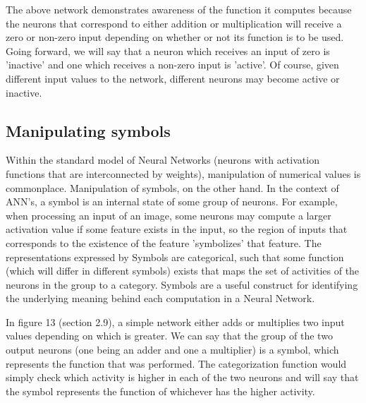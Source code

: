 \documentclass{article}
\begin{document}
		The above network demonstrates awareness of the function it computes because the neurons that correspond to either addition or multiplication will receive a zero or non-zero input depending on whether or not its function is to be used. Going forward, we will say that a neuron which receives an input of zero is 'inactive' and one which receives a non-zero input is 'active'. Of course, given different input values to the network, different neurons may become active or inactive. 
	
	\subsection{Manipulating symbols}
	
		Within the standard model of Neural Networks (neurons with activation functions that are interconnected by weights), manipulation of numerical values is commonplace. Manipulation of symbols, on the other hand. In the context of ANN's, a symbol is an internal state of some group of neurons. For example, when processing an input of an image, some neurons may compute a larger activation value if some feature exists in the input, so the region of inputs that corresponds to the existence of the feature 'symbolizes' that feature. The representations expressed by Symbols are categorical, such that some function (which will differ in different symbols) exists that maps the set of activities of the neurons in the group to a category. Symbols are a useful construct for identifying the underlying meaning behind each computation in a Neural Network.
		
		In figure 13 (section 2.9), a simple network either adds or multiplies two input values depending on which is greater. We can say that the group of the two output neurons (one being an adder and one a multiplier) is a symbol, which represents the function that was performed. The categorization function would simply check which activity is higher in each of the two neurons and will say that the symbol represents the function of whichever has the higher activity.
		
\end{document}
